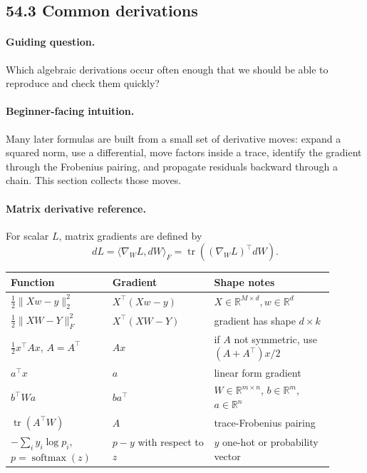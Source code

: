 \subsection{54.3 Common derivations}

\paragraph{Guiding question.}
Which algebraic derivations occur often enough that we should be able to reproduce and check them quickly?

\paragraph{Beginner-facing intuition.}
Many later formulas are built from a small set of derivative moves: expand a squared norm, use a differential, move factors inside a trace, identify the gradient through the Frobenius pairing, and propagate residuals backward through a chain. This section collects those moves.

\paragraph{Matrix derivative reference.}
For scalar \(L\), matrix gradients are defined by
\[
dL=\langle \nabla_W L,dW\rangle_F
=\operatorname{tr}((\nabla_W L)^\top dW).
\]

\begin{center}
\small
\setlength{\tabcolsep}{2pt}
\renewcommand{\arraystretch}{1.15}
\begin{tabular}{p{0.29\linewidth}p{0.28\linewidth}p{0.33\linewidth}}
\toprule
Function & Gradient & Shape notes \\
\midrule
\(\frac12\|Xw-y\|_2^2\) & \(X^\top(Xw-y)\) & \(X\in\mathbb R^{M\times d}, w\in\mathbb R^d\) \\
\(\frac12\|XW-Y\|_F^2\) & \(X^\top(XW-Y)\) & gradient has shape \(d\times k\) \\
\(\frac12 x^\top A x\), \(A=A^\top\) & \(Ax\) & if \(A\) not symmetric, use \((A+A^\top)x/2\) \\
\(a^\top x\) & \(a\) & linear form gradient \\
\(b^\top W a\) & \(ba^\top\) & \(W\in\mathbb R^{m\times n}\), \(b\in\mathbb R^m\), \(a\in\mathbb R^n\) \\
\(\operatorname{tr}(A^\top W)\) & \(A\) & trace-Frobenius pairing \\
\(-\sum_i y_i\log p_i\), \(p=\operatorname{softmax}(z)\) & \(p-y\) with respect to \(z\) & \(y\) one-hot or probability vector \\
\bottomrule
\end{tabular}
\end{center}

